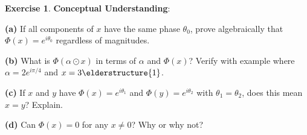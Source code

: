 \documentclass[12pt,a4paper]{book}
\theoremstyle{definition}
\newtheorem{exercise}{Exercise}[section]
\theoremstyle{remark}
\begin{document}
\begin{exercise}
\textbf{Conceptual Understanding}:

\textbf{(a)} If all components of $x$ have the same phase $\theta_0$, prove algebraically that $\Phi(x) = e^{i\theta_0}$ regardless of magnitudes.

\textbf{(b)} What is $\Phi(\alpha \odot x)$ in terms of $\alpha$ and $\Phi(x)$? Verify with example where $\alpha = 2e^{i\pi/4}$ and $x = 3\elderstructure{1}$.

\textbf{(c)} If $x$ and $y$ have $\Phi(x) = e^{i\theta_1}$ and $\Phi(y) = e^{i\theta_2}$ with $\theta_1 = \theta_2$, does this mean $x = y$? Explain.

\textbf{(d)} Can $\Phi(x) = 0$ for any $x \neq 0$? Why or why not?
\end{exercise}
\end{document}
